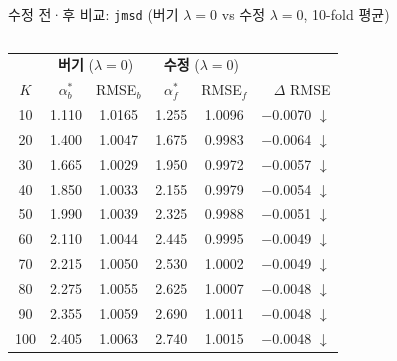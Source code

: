\documentclass[aspectratio=169,10pt]{beamer}
\begin{document}
\begin{frame}[shrink=20]{수정 전·후 비교: \texttt{jmsd} \textnormal{\small(버기 $\lambda=0$ vs 수정 $\lambda=0$, 10-fold 평균)}}
	\begin{columns}[T]
		\begin{center}
		\renewcommand{\arraystretch}{1.15}
		\small
		\begin{tabular}{c|cc|cc|r}
			\toprule
			& \multicolumn{2}{c|}{\textbf{버기} ($\lambda=0$)} & \multicolumn{2}{c|}{\textbf{수정} ($\lambda=0$)} & \\
			$K$ & $\alpha^*_b$ & RMSE$_b$ & $\alpha^*_f$ & RMSE$_f$ & $\Delta$ RMSE \\
			\midrule
			10  & 1.110 & 1.0165 & 1.255 & 1.0096 & \textcolor{testgreen}{$-$0.0070 $\downarrow$} \\
			20  & 1.400 & 1.0047 & 1.675 & 0.9983 & \textcolor{testgreen}{$-$0.0064 $\downarrow$} \\
			30  & 1.665 & 1.0029 & 1.950 & 0.9972 & \textcolor{testgreen}{$-$0.0057 $\downarrow$} \\
			40  & 1.850 & 1.0033 & 2.155 & 0.9979 & \textcolor{testgreen}{$-$0.0054 $\downarrow$} \\
			50  & 1.990 & 1.0039 & 2.325 & 0.9988 & \textcolor{testgreen}{$-$0.0051 $\downarrow$} \\
			60  & 2.110 & 1.0044 & 2.445 & 0.9995 & \textcolor{testgreen}{$-$0.0049 $\downarrow$} \\
			70  & 2.215 & 1.0050 & 2.530 & 1.0002 & \textcolor{testgreen}{$-$0.0049 $\downarrow$} \\
			80  & 2.275 & 1.0055 & 2.625 & 1.0007 & \textcolor{testgreen}{$-$0.0048 $\downarrow$} \\
			90  & 2.355 & 1.0059 & 2.690 & 1.0011 & \textcolor{testgreen}{$-$0.0048 $\downarrow$} \\
			100 & 2.405 & 1.0063 & 2.740 & 1.0015 & \textcolor{testgreen}{$-$0.0048 $\downarrow$} \\
			\bottomrule
		\end{tabular}
		\end{center}


\end{columns}
\end{frame}
\end{document}
